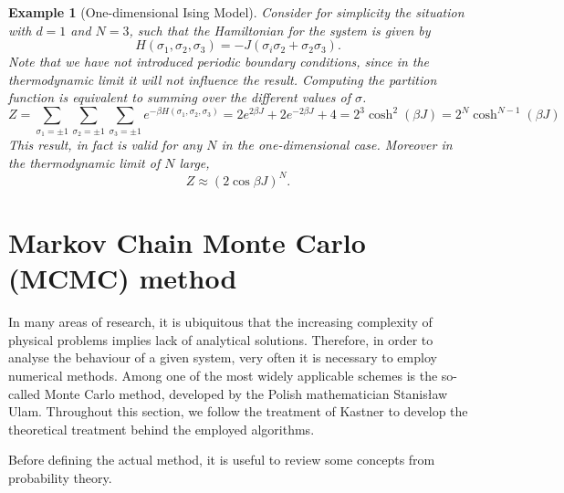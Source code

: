 \documentclass[]{article}
\numberwithin{equation}{section}
\theoremstyle{break}
\newtheorem*{example}{Example}
\newcommand{\bk}{\par\null\par\noindent}
\begin{document}
\begin{example}[One-dimensional Ising Model]
Consider for simplicity the situation with $d=1$ and $N = 3$, such that the Hamiltonian for the system is given by \cite{cipra-1987}
\[H(\sigma_1, \sigma_2, \sigma_3) = -J(\sigma_i\sigma_2 + \sigma_2\sigma_3).\]
Note that we have not introduced periodic boundary conditions, since in the thermodynamic limit it will not influence the result. Computing the partition function is equivalent to summing over the different values of $\sigma$.
\[Z = \sum_{\sigma_1=\pm1}\sum_{\sigma_2 = \pm1}\sum_{\sigma_3=\pm1}e^{-\beta H(\sigma_1, \sigma_2, \sigma_3)} = 2e^{2\beta J} + 2e^{-2\beta J} + 4 = 2^3\cosh^2(\beta J) = 2^N\cosh^{N-1}(\beta J)\]
This result, in fact is valid for any $N$ in the one-dimensional case. Moreover in the thermodynamic limit of $N$ large,
\begin{equation}
Z \approx (2\cos\beta J)^N.
\label{eq:1d_Z}
\end{equation}
\end{example}
\newpage

\section{Markov Chain Monte Carlo (MCMC) method}
In many areas of research, it is ubiquitous that the increasing complexity of physical problems implies lack of analytical solutions. Therefore, in order to analyse the behaviour of a given system, very often it is necessary to employ numerical methods. Among one of the most widely applicable schemes is the so-called Monte Carlo method, developed by the Polish mathematician Stanisław Ulam. Throughout this section, we follow the treatment of Kastner \cite{kastner-2010} to develop the theoretical treatment behind the employed algorithms.
\bk
Before defining the actual method, it is useful to review some concepts from probability theory.
\end{document}
